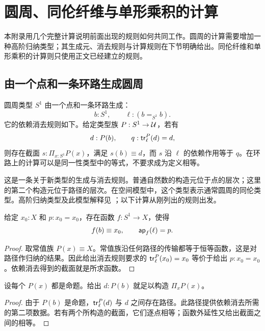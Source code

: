 \chapter{圆周、同伦纤维与单形乘积的计算}
\label{chap:calculations}

本附录用几个完整计算说明前面出现的规则如何共同工作。圆周的计算需要增加一种高阶归纳类型；其生成元、消去规则与计算规则在下节明确给出。同伦纤维和单形乘积的计算则只使用正文已经建立的规则。

\section{由一个点和一条环路生成圆周}

\begin{definition}[圆周的高阶归纳规则]
圆周类型 $S^1$ 由一个点和一条环路生成：
\[
 b:S^1,\qquad \ell:(b=_{S^1}b).
\]
它的依赖消去规则如下。给定类型族 $P:S^1\to\mathcal U$，若有
\[
 d:P(b),\qquad q:\mathsf{tr}^P_\ell(d)=d,
\]
则存在截面 $s:\Pi_{x:S^1}P(x)$，满足 $s(b)\equiv d$，而 $s$ 沿 $\ell$ 的依赖作用等于 $q$。在环路上的计算可以是同一性类型中的等式，不要求成为定义相等。
\end{definition}

\begin{remark}
这是一条关于新类型的生成与消去规则。普通自然数的构造元位于点的层次；这里的第二个构造元位于路径的层次。在空间模型中，这个类型表示通常圆周的同伦类型。高阶归纳类型及此模型解释见 \cite{HoTT,Rijke}；以下计算从刚列出的规则出发。
\end{remark}

\begin{proposition}[圆周的递归规则]
给定 $x_0:X$ 和 $p:x_0=x_0$，存在函数 $f:S^1\to X$，使得
\[
 f(b)\equiv x_0,\qquad \mathsf{ap}_f(\ell)=p.
\]
\end{proposition}
\begin{proof}
取常值族 $P(x)\equiv X$。常值族沿任何路径的传输都等于恒等函数，这是对路径作归纳的结果。因此给出消去规则要求的 $\mathsf{tr}^P_\ell(x_0)=x_0$ 等价于给出 $p:x_0=x_0$。依赖消去得到的截面就是所求函数。
\end{proof}

\begin{lemma}[命题值族上的圆周归纳]
设每个 $P(x)$ 都是命题。给出 $d:P(b)$ 就足以构造 $\Pi_xP(x)$。
\end{lemma}
\begin{proof}
由于 $P(b)$ 是命题，$\mathsf{tr}^P_\ell(d)$ 与 $d$ 之间存在路径。此路径提供依赖消去所需的第二项数据。若有两个所构造的截面，它们逐点相等；函数外延性又给出截面之间的相等。
\end{proof}

